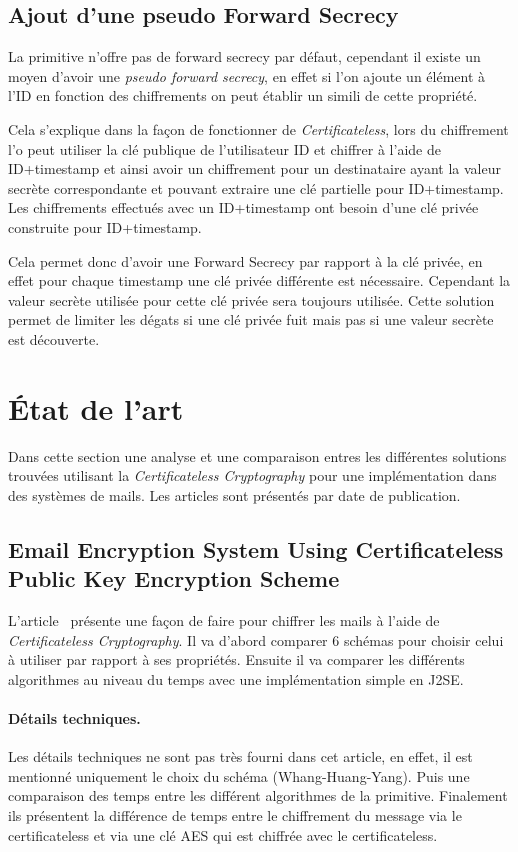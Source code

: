 \subsection{Ajout d'une pseudo Forward Secrecy}
\label{subsec:pseudoSecrecy}
La primitive n'offre pas de forward secrecy par défaut, cependant il existe un moyen d'avoir une \textit{pseudo forward secrecy}, en effet si l'on ajoute un élément à l'ID en fonction des chiffrements on peut établir un simili de cette propriété.

Cela s'explique dans la façon de fonctionner de \textit{Certificateless}, lors du chiffrement l'o peut utiliser la clé publique de l'utilisateur ID et chiffrer à l'aide de ID+timestamp et ainsi avoir un chiffrement pour un destinataire ayant la valeur secrète correspondante et pouvant extraire une clé partielle pour ID+timestamp. Les chiffrements effectués avec un ID+timestamp ont besoin d'une clé privée construite pour ID+timestamp.

Cela permet donc d'avoir une Forward Secrecy par rapport à la clé privée, en effet pour chaque timestamp une clé privée différente est nécessaire. Cependant la valeur secrète utilisée pour cette clé privée sera toujours utilisée. Cette solution permet de limiter les dégats si une clé privée fuit mais pas si une valeur secrète est découverte.

\section{État de l'art}
Dans cette section une analyse et une comparaison entres les différentes solutions trouvées utilisant la \textit{Certificateless Cryptography} pour une implémentation dans des systèmes de mails. Les articles sont présentés par date de publication. 

\subsection{Email Encryption System Using Certificateless Public Key Encryption Scheme}
L'article~\cite{DBLP:conf/itcs2/ErYTG12} présente une façon de faire pour chiffrer les mails à l'aide de \textit{Certificateless Cryptography}. Il va d'abord comparer 6 schémas pour choisir celui à utiliser par rapport à ses propriétés. Ensuite il va comparer les différents algorithmes au niveau du temps avec une implémentation simple en J2SE. 
\paragraph*{Détails techniques.} Les détails techniques ne sont pas très fourni dans cet article, en effet, il est mentionné uniquement le choix du schéma (Whang-Huang-Yang). Puis une comparaison des temps entre les différent algorithmes de la primitive. Finalement ils présentent la différence de temps entre le chiffrement du message via le certificateless et via une clé AES qui est chiffrée avec le certificateless.
